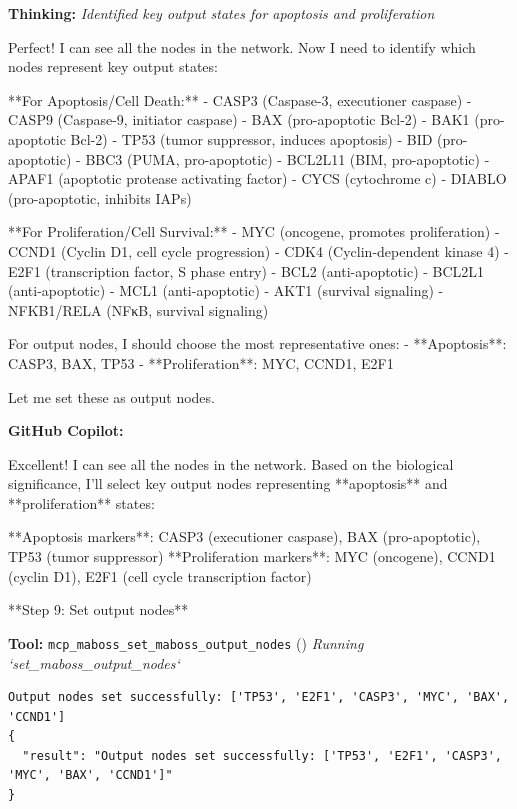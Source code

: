 \documentclass[11pt,a4paper]{article}
\begin{document}
\begin{thinkbox}
\textbf{Thinking:} \textit{Identified key output states for apoptosis and proliferation}

Perfect! I can see all the nodes in the network. Now I need to identify which nodes represent key output states:

**For Apoptosis/Cell Death:**
- CASP3 (Caspase-3, executioner caspase)
- CASP9 (Caspase-9, initiator caspase)
- BAX (pro-apoptotic Bcl-2)
- BAK1 (pro-apoptotic Bcl-2)
- TP53 (tumor suppressor, induces apoptosis)
- BID (pro-apoptotic)
- BBC3 (PUMA, pro-apoptotic)
- BCL2L11 (BIM, pro-apoptotic)
- APAF1 (apoptotic protease activating factor)
- CYCS (cytochrome c)
- DIABLO (pro-apoptotic, inhibits IAPs)

**For Proliferation/Cell Survival:**
- MYC (oncogene, promotes proliferation)  
- CCND1 (Cyclin D1, cell cycle progression)
- CDK4 (Cyclin-dependent kinase 4)
- E2F1 (transcription factor, S phase entry)
- BCL2 (anti-apoptotic)
- BCL2L1 (anti-apoptotic)
- MCL1 (anti-apoptotic)
- AKT1 (survival signaling)
- NFKB1/RELA (NFκB, survival signaling)

For output nodes, I should choose the most representative ones:
- **Apoptosis**: CASP3, BAX, TP53
- **Proliferation**: MYC, CCND1, E2F1

Let me set these as output nodes.

\end{thinkbox}
\begin{copilotbox}
\textbf{GitHub Copilot:}

Excellent! I can see all the nodes in the network. Based on the biological significance, I'll select key output nodes representing **apoptosis** and **proliferation** states:

**Apoptosis markers**: CASP3 (executioner caspase), BAX (pro-apoptotic), TP53 (tumor suppressor)  
**Proliferation markers**: MYC (oncogene), CCND1 (cyclin D1), E2F1 (cell cycle transcription factor)

**Step 9: Set output nodes**

\end{copilotbox}
\begin{toolokbox}
\textbf{Tool:} \texttt{mcp\_maboss\_set\_maboss\_output\_nodes} (\checkmark)
\textit{Running `set\_maboss\_output\_nodes`}
\begin{lstlisting}
Output nodes set successfully: ['TP53', 'E2F1', 'CASP3', 'MYC', 'BAX', 'CCND1']
{
  "result": "Output nodes set successfully: ['TP53', 'E2F1', 'CASP3', 'MYC', 'BAX', 'CCND1']"
}
\end{lstlisting}
\end{toolokbox}
\end{document}
